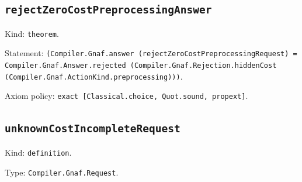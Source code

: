 \documentclass[11pt]{article}
\begin{document}
\subsection*{\texttt{rejectZeroCostPreprocessingAnswer}}
\noindent Kind: \texttt{theorem}.\par
\noindent Statement: \texttt{(Compiler.Gnaf.answer (rejectZeroCostPreprocessingRequest) = Compiler.Gnaf.Answer.rejected (Compiler.Gnaf.Rejection.hiddenCost (Compiler.Gnaf.ActionKind.preprocessing)))}.\par
\noindent Axiom policy: \texttt{exact [Classical.choice, Quot.sound, propext]}.\par
\subsection*{\texttt{unknownCostIncompleteRequest}}
\noindent Kind: \texttt{definition}.\par
\noindent Type: \texttt{Compiler.Gnaf.Request}.\par
\end{document}
